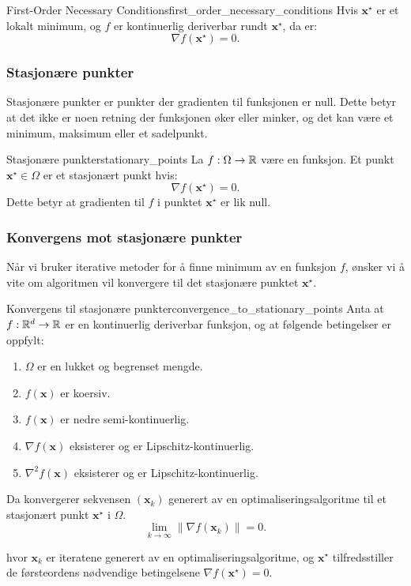 \begin{theorem}{First-Order Necessary Conditions}{first_order_necessary_conditions}
	Hvis \(\mathbf{x}^\star\) er et lokalt minimum, og \(f\) er kontinuerlig deriverbar rundt \(\mathbf{x}^\star\), da er:
	\[
		\nabla f(\mathbf{x}^\star) = 0.
	\]
\end{theorem}

\subsubsection{Stasjonære punkter}
Stasjonære punkter er punkter der gradienten til funksjonen er null. Dette betyr at det ikke er noen retning der funksjonen øker eller minker, og det kan være et minimum, maksimum eller et sadelpunkt.

\begin{corollary}{Stasjonære punkter}{stationary_points}
	La \(f: \Omega \to \mathbb{R}\) være en funksjon. Et punkt \(\symbf{x}^\star \in \Omega\) er et stasjonært punkt hvis:
	\[
		\nabla f(\symbf{x}^\star) = 0.
	\]
	Dette betyr at gradienten til \(f\) i punktet \(\symbf{x}^\star\) er lik null.
\end{corollary}

\subsubsection{Konvergens mot stasjonære punkter}
Når vi bruker iterative metoder for å finne minimum av en funksjon \(f\), ønsker vi å vite om algoritmen vil konvergere til det stasjonære punktet \(\symbf{x}^\star\).

\begin{theorem}{Konvergens til stasjonære punkter}{convergence_to_stationary_points}
	Anta at \(f: \mathbb{R}^d \to \mathbb{R}\) er en kontinuerlig deriverbar funksjon, og at følgende betingelser er oppfylt:
	\begin{enumerate}
		\item \(\Omega\) er en lukket og begrenset mengde.
		\item \(f(\symbf{x})\) er koersiv.
		\item \(f(\symbf{x})\) er nedre semi-kontinuerlig.
		\item \(\nabla f(\symbf{x})\) eksisterer og er Lipschitz-kontinuerlig.
		\item \(\nabla^2 f(\symbf{x})\) eksisterer og er Lipschitz-kontinuerlig.
	\end{enumerate}
	Da konvergerer sekvensen \((\symbf{x}_k)\) generert av en optimaliseringsalgoritme til et stasjonært punkt \(\symbf{x}^\star\) i \(\Omega\).
	\[
		\lim_{k \to \infty} \|\nabla f(\symbf{x}_k)\| = 0.
	\]

	hvor \(\symbf{x}_k\) er iteratene generert av en optimaliseringsalgoritme, og \(\symbf{x}^\star\) tilfredsstiller de førsteordens nødvendige betingelsene \(\nabla f(\symbf{x}^\star) = 0\).

\end{theorem}

